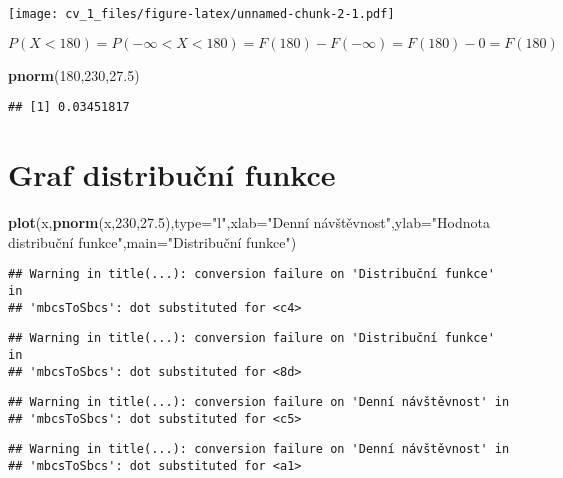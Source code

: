 \documentclass[
]{article}
\newenvironment{Shaded}{\begin{snugshade}}{\end{snugshade}}
\newcommand{\AttributeTok}[1]{\textcolor[rgb]{0.13,0.29,0.53}{#1}}
\newcommand{\DecValTok}[1]{\textcolor[rgb]{0.00,0.00,0.81}{#1}}
\newcommand{\FloatTok}[1]{\textcolor[rgb]{0.00,0.00,0.81}{#1}}
\newcommand{\FunctionTok}[1]{\textcolor[rgb]{0.13,0.29,0.53}{\textbf{#1}}}
\newcommand{\NormalTok}[1]{#1}
\newcommand{\StringTok}[1]{\textcolor[rgb]{0.31,0.60,0.02}{#1}}
\begin{document}
\texttt{[image: cv\_1\_files/figure-latex/unnamed-chunk-2-1.pdf]}

\(P(X<180) = P(-\infty<X<180) = F(180)-F(-\infty) = F(180)-0 = F(180)\)

\begin{Shaded}
\begin{Highlighting}[]
\FunctionTok{pnorm}\NormalTok{(}\DecValTok{180}\NormalTok{,}\DecValTok{230}\NormalTok{,}\FloatTok{27.5}\NormalTok{)}
\end{Highlighting}
\end{Shaded}

\begin{verbatim}
## [1] 0.03451817
\end{verbatim}

\section{Graf distribuční funkce}\label{graf-distribuux10dnuxed-funkce}

\begin{Shaded}
\begin{Highlighting}[]
\FunctionTok{plot}\NormalTok{(x,}\FunctionTok{pnorm}\NormalTok{(x,}\DecValTok{230}\NormalTok{,}\FloatTok{27.5}\NormalTok{),}\AttributeTok{type=}\StringTok{"l"}\NormalTok{,}\AttributeTok{xlab=}\StringTok{"Denní návštěvnost"}\NormalTok{,}\AttributeTok{ylab=}\StringTok{"Hodnota distribuční funkce"}\NormalTok{,}\AttributeTok{main=}\StringTok{"Distribuční funkce"}\NormalTok{)}
\end{Highlighting}
\end{Shaded}

\begin{verbatim}
## Warning in title(...): conversion failure on 'Distribuční funkce' in
## 'mbcsToSbcs': dot substituted for <c4>
\end{verbatim}

\begin{verbatim}
## Warning in title(...): conversion failure on 'Distribuční funkce' in
## 'mbcsToSbcs': dot substituted for <8d>
\end{verbatim}

\begin{verbatim}
## Warning in title(...): conversion failure on 'Denní návštěvnost' in
## 'mbcsToSbcs': dot substituted for <c5>
\end{verbatim}

\begin{verbatim}
## Warning in title(...): conversion failure on 'Denní návštěvnost' in
## 'mbcsToSbcs': dot substituted for <a1>
\end{verbatim}
\end{document}
